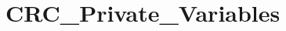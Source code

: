 \hypertarget{group___c_r_c___private___variables}{\section{C\-R\-C\-\_\-\-Private\-\_\-\-Variables}
\label{group___c_r_c___private___variables}
}

